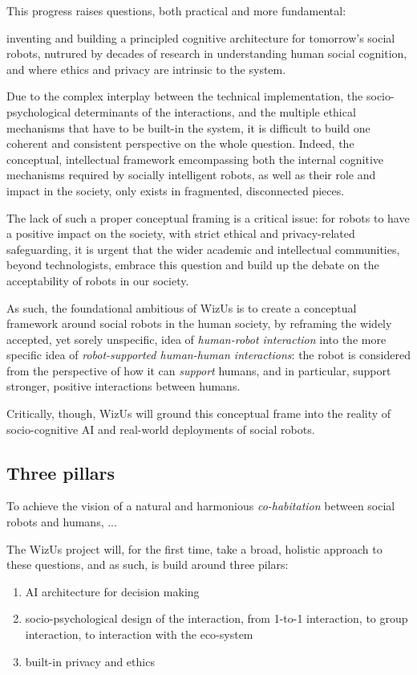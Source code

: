 \documentclass[11pt]{report}
\newcommand{\project}{WizUs\xspace}
\begin{document}
This progress raises questions, both practical and more fundamental:

inventing and building a principled cognitive architecture for tomorrow's social
robots, nutrured by decades of research in understanding human social cognition,
and where ethics and privacy are intrinsic to the system.

Due to the complex interplay between the technical implementation, the
socio-psychological determinants of the interactions, and the multiple ethical
mechanisms that have to be built-in the system, it is difficult to build one
coherent and consistent perspective on the whole question. Indeed, the
conceptual, intellectual framework emcompassing both the internal cognitive
mechanisms required by socially intelligent robots, as well as their role and
impact in the society, only exists in fragmented, disconnected pieces.

The lack of such a proper conceptual framing is a critical issue: for robots to
have a positive impact on the society, with strict ethical and privacy-related
safeguarding, it is urgent that the wider academic and intellectual communities,
beyond technologists, embrace this question and build up the debate on the
acceptability of robots in our society.

As such, the foundational ambitious of \project is to create a conceptual
framework around social robots in the human society, by reframing the widely
accepted, yet sorely unspecific, idea of \emph{human-robot interaction} into the
more specific idea of \emph{robot-supported human-human interactions}: the robot
is considered from the perspective of how it can \emph{support} humans, and in
particular, support stronger, positive interactions between humans.

Critically, though, \project will ground this conceptual frame into the reality
of socio-cognitive AI and real-world deployments of social robots.


\subsection{Three pillars}

To achieve the vision of a natural and harmonious \emph{co-habitation} between
social robots and humans, ...

The \project project will, for the first time, take a broad, holistic approach
to these questions, and as such, is build around three pilars:

\begin{enumerate}
    \item AI architecture for decision making
    \item socio-psychological design of the interaction, from 1-to-1
        interaction, to group interaction, to interaction with the eco-system
    \item built-in privacy and ethics
\end{enumerate}
\end{document}
